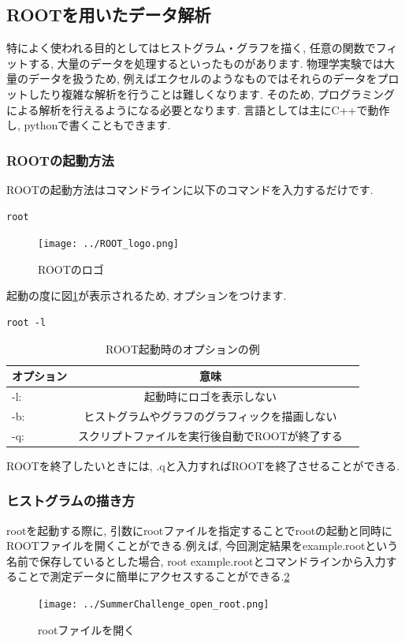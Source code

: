 \subsection{ROOTを用いたデータ解析}
特によく使われる目的としてはヒストグラム・グラフを描く, 任意の関数でフィットする, 大量のデータを処理するといったものがあります.
物理学実験では大量のデータを扱うため, 例えばエクセルのようなものではそれらのデータをプロットしたり複雑な解析を行うことは難しくなります.
そのため, プログラミングによる解析を行えるようになる必要となります.
言語としては主にC++で動作し, pythonで書くこともできます.

\subsubsection{ROOTの起動方法}
ROOTの起動方法はコマンドラインに以下のコマンドを入力するだけです.
\begin{lstlisting}
root
\end{lstlisting}
\begin{figure}[ht]
  \begin{center}
    \texttt{[image: ../ROOT\_logo.png]}
    \caption{ROOTのロゴ}
    \label{fig:ROOT_logo}
  \end{center}
\end{figure}
起動の度に図\ref{fig:ROOT_logo}が表示されるため, オプションをつけます.
\begin{lstlisting}
root -l
\end{lstlisting}
\begin{table}[ht]
  \caption{ROOT起動時のオプションの例}
  \centering
  \begin{tabular}{lcr}
    \hline
    オプション & 意味                                           \\
    \hline \hline
    -l:        & 起動時にロゴを表示しない                       \\
    -b:        & ヒストグラムやグラフのグラフィックを描画しない \\
    -q:        & スクリプトファイルを実行後自動でROOTが終了する \\
    \hline
  \end{tabular}
\end{table}
ROOTを終了したいときには, .qと入力すればROOTを終了させることができる.

\subsubsection{ヒストグラムの描き方}
rootを起動する際に, 引数にrootファイルを指定することでrootの起動と同時にROOTファイルを開くことができる.例えば, 今回測定結果をexample.rootという名前で保存しているとした場合, root example.rootとコマンドラインから入力することで測定データに簡単にアクセスすることができる.\ref{fig:open_ROOT}
\begin{figure}[h]
  \begin{center}
    \texttt{[image: ../SummerChallenge\_open\_root.png]}
    \caption{rootファイルを開く}
    \label{fig:open_ROOT}
  \end{center}
\end{figure}

